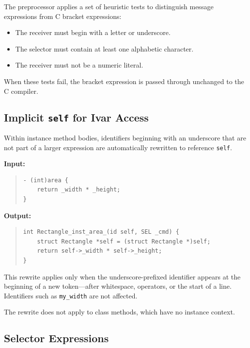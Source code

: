 \documentclass[11pt,twoside]{article}
\begin{document}
The preprocessor applies a set of heuristic tests to distinguish message
expressions from C bracket expressions:

\begin{itemize}
  \item The receiver must begin with a letter or underscore.
  \item The selector must contain at least one alphabetic character.
  \item The receiver must not be a numeric literal.
\end{itemize}

When these tests fail, the bracket expression is passed through
unchanged to the C compiler.

\subsection{Implicit {\tt self} for Ivar Access}

Within instance method bodies, identifiers beginning with an underscore
that are not part of a larger expression are automatically rewritten to
reference {\tt self}.

{\bf Input:}
\begin{quote}
\begin{verbatim}
- (int)area {
    return _width * _height;
}
\end{verbatim}
\end{quote}

{\bf Output:}
\begin{quote}
\begin{verbatim}
int Rectangle_inst_area_(id self, SEL _cmd) {
    struct Rectangle *self = (struct Rectangle *)self;
    return self->_width * self->_height;
}
\end{verbatim}
\end{quote}

This rewrite applies only when the underscore-prefixed identifier
appears at the beginning of a new token---after whitespace, operators,
or the start of a line.  Identifiers such as {\tt my\_width} are not
affected.

The rewrite does not apply to class methods, which have no instance
context.

\subsection{Selector Expressions}
\end{document}
